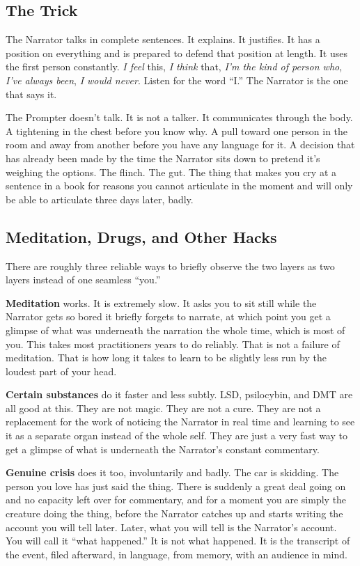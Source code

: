 \documentclass[11pt, letterpaper]{article}
\begin{document}
\subsection{The Trick}

The Narrator talks in complete sentences. It explains. It justifies. It has a position on everything and is prepared to defend that position at length. It uses the first person constantly. \textit{I feel} this, \textit{I think} that, \textit{I'm the kind of person who}, \textit{I've always been}, \textit{I would never}. Listen for the word ``I.'' The Narrator is the one that says it.

The Prompter doesn't talk. It is not a talker. It communicates through the body. A tightening in the chest before you know why. A pull toward one person in the room and away from another before you have any language for it. A decision that has already been made by the time the Narrator sits down to pretend it's weighing the options. The flinch. The gut. The thing that makes you cry at a sentence in a book for reasons you cannot articulate in the moment and will only be able to articulate three days later, badly.

\subsection{Meditation, Drugs, and Other Hacks}

There are roughly three reliable ways to briefly observe the two layers as two layers instead of one seamless ``you.''

\textbf{Meditation} works. It is extremely slow. It asks you to sit still while the Narrator gets so bored it briefly forgets to narrate, at which point you get a glimpse of what was underneath the narration the whole time, which is most of you. This takes most practitioners years to do reliably. That is not a failure of meditation. That is how long it takes to learn to be slightly less run by the loudest part of your head.

\textbf{Certain substances} do it faster and less subtly. LSD, psilocybin, and DMT are all good at this. They are not magic. They are not a cure. They are not a replacement for the work of noticing the Narrator in real time and learning to see it as a separate organ instead of the whole self. They are just a very fast way to get a glimpse of what is underneath the Narrator's constant commentary.

\textbf{Genuine crisis} does it too, involuntarily and badly. The car is skidding. The person you love has just said the thing. There is suddenly a great deal going on and no capacity left over for commentary, and for a moment you are simply the creature doing the thing, before the Narrator catches up and starts writing the account you will tell later. Later, what you will tell is the Narrator's account. You will call it ``what happened.'' It is not what happened. It is the transcript of the event, filed afterward, in language, from memory, with an audience in mind.
\end{document}

